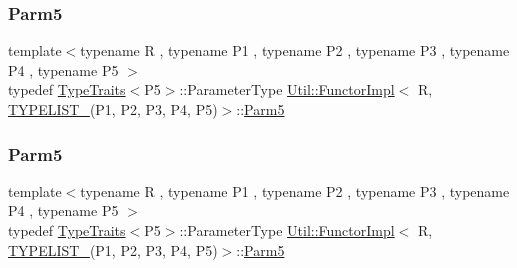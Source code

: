 \mbox{\label{classUtil_1_1FunctorImpl_3_01R_00_01TYPELIST__5_07P1_00_01P2_00_01P3_00_01P4_00_01P5_08_4_a465c4b811dcbcfecb64048b28429c6ab}} 
\subsubsection{\texorpdfstring{Parm5}{Parm5}\hspace{0.1cm}{\footnotesize\ttfamily [1/2]}}
{\footnotesize\ttfamily template$<$typename R , typename P1 , typename P2 , typename P3 , typename P4 , typename P5 $>$ \\
typedef \mbox{\hyperlink{classUtil_1_1TypeTraits}{Type\+Traits}}$<$P5$>$\+::Parameter\+Type \mbox{\hyperlink{classUtil_1_1FunctorImpl}{Util\+::\+Functor\+Impl}}$<$ R, \mbox{\hyperlink{install_2include_2adat_2typelist_8h_aad5d9b3c82c8503c85c625acd41c0a2f}{T\+Y\+P\+E\+L\+I\+S\+T\+\_}}(P1, P2, P3, P4, P5)$>$\+::\mbox{\hyperlink{structUtil_1_1Private_1_1FunctorImplBase_ac5b1d132e854e4f9fd6fb1e43313fa26}{Parm5}}}

\mbox{\label{classUtil_1_1FunctorImpl_3_01R_00_01TYPELIST__5_07P1_00_01P2_00_01P3_00_01P4_00_01P5_08_4_a465c4b811dcbcfecb64048b28429c6ab}} 
\subsubsection{\texorpdfstring{Parm5}{Parm5}\hspace{0.1cm}{\footnotesize\ttfamily [2/2]}}
{\footnotesize\ttfamily template$<$typename R , typename P1 , typename P2 , typename P3 , typename P4 , typename P5 $>$ \\
typedef \mbox{\hyperlink{classUtil_1_1TypeTraits}{Type\+Traits}}$<$P5$>$\+::Parameter\+Type \mbox{\hyperlink{classUtil_1_1FunctorImpl}{Util\+::\+Functor\+Impl}}$<$ R, \mbox{\hyperlink{install_2include_2adat_2typelist_8h_aad5d9b3c82c8503c85c625acd41c0a2f}{T\+Y\+P\+E\+L\+I\+S\+T\+\_}}(P1, P2, P3, P4, P5)$>$\+::\mbox{\hyperlink{structUtil_1_1Private_1_1FunctorImplBase_ac5b1d132e854e4f9fd6fb1e43313fa26}{Parm5}}}

